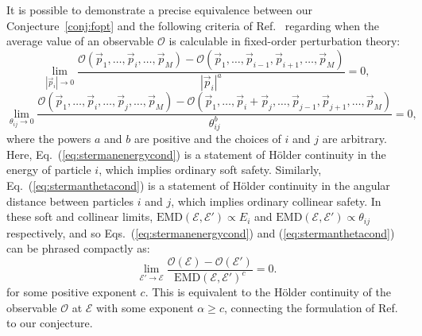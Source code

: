 \documentclass[letterpaper,11pt]{article}
\newcommand{\E}{\mathcal{E}}
\renewcommand{\O}{\mathcal{O}}
\DeclareRobustCommand{\Eq}[1]{Eq.~(\ref{#1})}
\DeclareRobustCommand{\Eqs}[2]{Eqs.~(\ref{#1}) and (\ref{#2})}
\DeclareRobustCommand{\Ref}[1]{Ref.~\cite{#1}}
\newcommand{\EMD}{\text{EMD}\xspace}
\begin{document}
It is possible to demonstrate a precise equivalence between our Conjecture~\ref{conj:fopt} and the following criteria of \Ref{Sterman:1979uw} regarding when the average value of an observable $\O$ is calculable in fixed-order perturbation theory:
%
\begin{equation}
\label{eq:stermanenergycond}
\lim_{|\vec p_i|\to0}\frac{\O(\vec p_1,\ldots,\vec p_i,\ldots,\vec p_M)-\O(\vec p_1,\ldots,\vec p_{i-1},\vec p_{i+1},\ldots,\vec p_M)}{|\vec p_i|^a}=0,
\end{equation}
\begin{equation}
\label{eq:stermanthetacond}
\lim_{\theta_{ij}\to0}\frac{\O(\vec p_1,\ldots,\vec p_i,\ldots,\vec p_j,\ldots, \vec p_M)-\O(\vec p_1,\ldots,\vec p_i+\vec p_j,\ldots,\vec p_{j-1},\vec p_{j+1},\ldots, \vec p_M)}{\theta_{ij}^b}=0,
\end{equation}
%
where the powers $a$ and $b$ are positive and the choices of $i$ and $j$ are arbitrary.
%
Here, \Eq{eq:stermanenergycond} is a statement of H\"older continuity in the energy of particle $i$, which implies ordinary soft safety.
%
Similarly, \Eq{eq:stermanthetacond} is a statement of H\"older continuity in the angular distance between particles $i$ and $j$, which implies ordinary collinear safety.
%
In these soft and collinear limits, $\EMD(\mathcal E, \mathcal E') \propto E_i$ and $\EMD(\mathcal E, \mathcal E') \propto \theta_{ij}$ respectively, and so \Eqs{eq:stermanenergycond}{eq:stermanthetacond} can be phrased compactly as:
\begin{equation}
\lim_{\mathcal E' \to \mathcal E} \frac{\mathcal O(\mathcal E) - \mathcal O(\mathcal E')}{\EMD(\mathcal E, \mathcal E')^c} = 0.
\end{equation}
for some positive exponent $c$.
%
This is equivalent to the H{\"{o}}lder continuity of the observable $\mathcal O$ at $\E$ with some exponent $\alpha \ge c$, connecting the formulation of \Ref{Sterman:1979uw} to our conjecture.
\end{document}
